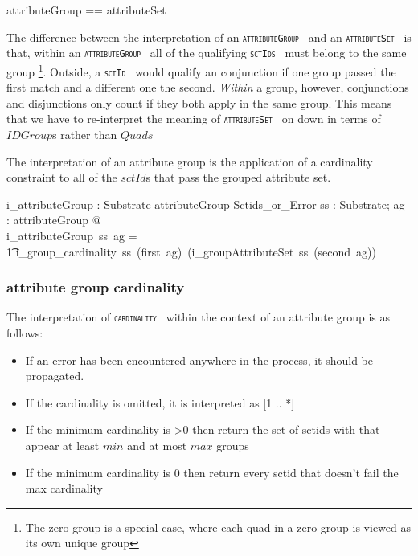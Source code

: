 \documentclass{article}
\def\spec#1{{\tt \small \textsc{{#1}} }}
\begin{document}
\begin{zed}
attributeGroup == \optional[cardinality] \cross attributeSet
\end{zed}

The difference between the interpretation of an \spec{attributeGroup} and an \spec{attributeSet} is that, within an \spec{attributeGroup} all of the 
qualifying \spec{sctIds} must belong to the same group \footnote{The zero group is a special case, where each quad in a zero group is viewed as its own unique group}.  Outside, a \spec{sctId} would qualify an conjunction if one group passed the first match
and a different one the second.  \emph{Within} a group, however, conjunctions and disjunctions only count if they both apply in the same group.  This means
that we have to re-interpret the meaning of \spec{attributeSet} on down in terms of $IDGroup$s rather than $Quads$

The interpretation of an attribute group is the application of a cardinality constraint to all of the $sctId$s that pass the grouped 
attribute set.

\begin{axdef}
   i\_attributeGroup : Substrate \fun attributeGroup \fun Sctids\_or\_Error
\where
   \forall ss : Substrate; ag : attributeGroup @ \\
   i\_attributeGroup~ss~ag = \\
   \t1  i\_group\_cardinality~ss~(first~ag)~(i\_groupAttributeSet~ss~(second~ag))
\end{axdef}

\subsubsection{attribute group cardinality}
The interpretation of \spec{cardinality} within the context of an attribute group is as follows:
\begin{itemize}[noitemsep]
\item If an error has been encountered anywhere in the process, it should be propagated.
\item If the cardinality is omitted, it is interpreted as [1 .. *]
\item If the minimum cardinality is \textgreater  0 then return the set of sctids with that appear at least $min$ and at most $max$ groups
\item If the minimum cardinality is 0 then return every sctid that doesn't fail the max cardinality
\end{itemize}
\end{document}
